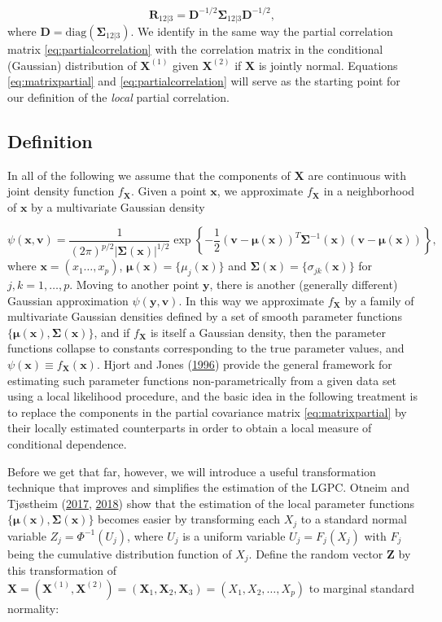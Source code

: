 \documentclass[
  12pt,
  letterpaper]{article}
\newcommand{\X}{\bm{X}}
\newcommand{\Xone}{\bm{X}^{(1)}}
\newcommand{\Xtwo}{\bm{X}^{(2)}}
\newcommand{\x}{\bm{x}}
\newcommand{\Z}{\bm{Z}}
\newcommand{\D}{\bm{D}}
\newcommand{\y}{\bm{y}}
\newcommand{\fv}{\bm{v}}
\newcommand{\R}{\bm{R}}
\newcommand{\fmu}{\bm{\mu}}
\newcommand{\fSigma}{\bm{\Sigma}}
\theoremstyle{definition}
\theoremstyle{definition}
\theoremstyle{definition}
\theoremstyle{remark}
\begin{document}
\begin{equation}
\R_{12|3} = \D^{-1/2}\fSigma_{12|3}\D^{-1/2},
\label{eq:partialcorrelation}
\end{equation}
where \(\D = \textrm{diag}(\fSigma_{12|3})\). We identify in the same way the partial correlation matrix \eqref{eq:partialcorrelation} with the correlation matrix in the conditional (Gaussian) distribution of \(\Xone\) given \(\Xtwo\) if \(\X\) is jointly normal. Equations \eqref{eq:matrixpartial} and \eqref{eq:partialcorrelation} will serve as the starting point for our definition of the \emph{local} partial correlation.

\hypertarget{chap:definition}{%
\subsection{Definition}\label{chap:definition}}

In all of the following we assume that the components of \(\X\) are continuous with joint density function \(f_{\X}\). Given a point \(\x\), we approximate \(f_{\X}\) in a neighborhood of \(\x\) by a multivariate Gaussian density

\begin{equation} 
\psi(\x, \fv) = \frac{1}{(2\pi)^{p/2}|\fSigma(\x)|^{1/2}} \exp \left\{-\frac{1}{2}(\fv - \fmu(\x))^T\fSigma^{-1}(\x)(\fv - \fmu(\x))\right\},
\label{eq:localgaussian}
\end{equation}
where \(\x = (x_1\ldots, x_p)\), \(\fmu(\x) = \{\mu_j(\x)\}\) and \(\fSigma(\x) = \{\sigma_{jk}(\x)\}\) for \(j,k=1,\ldots, p\). Moving to another point \(\y\), there is another (generally different) Gaussian approximation \(\psi(\y, \fv)\). In this way we approximate \(f_{\X}\) by a family of multivariate Gaussian densities defined by a set of smooth parameter functions \(\{\fmu(\x), \fSigma(\x)\}\), and if \(f_{\X}\) is itself a Gaussian density, then the parameter functions collapse to constants corresponding to the true parameter values, and \(\psi(\x) \equiv f_{\X}(\x)\). Hjort and Jones (\protect\hyperlink{ref-hjort1996locally}{1996}) provide the general framework for estimating such parameter functions non-parametrically from a given data set using a local likelihood procedure, and the basic idea in the following treatment is to replace the components in the partial covariance matrix \eqref{eq:matrixpartial} by their locally estimated counterparts in order to obtain a local measure of conditional dependence.

Before we get that far, however, we will introduce a useful transformation technique that improves and simplifies the estimation of the LGPC. Otneim and Tjøstheim (\protect\hyperlink{ref-otneim2017locally}{2017}, \protect\hyperlink{ref-otneim2017conditional}{2018}) show that the estimation of the local parameter functions \(\{\fmu(\x), \fSigma(\x)\}\) becomes easier by transforming each \(X_j\) to a standard normal variable \(Z_j = \Phi^{-1}(U_j)\), where \(U_j\) is a uniform variable \(U_j = F_{j}(X_j)\) with \(F_{j}\) being the cumulative distribution function of \(X_j\). Define the random vector \(\Z\) by this transformation of \(\X = (\Xone, \Xtwo) = (\X_1, \X_2, \X_3) = (X_1, X_2, \ldots, X_p)\) to marginal standard normality:
\end{document}
